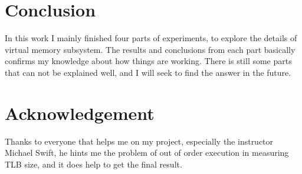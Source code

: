 \section{Conclusion}
    \label{sec:conc}
   In this work I mainly finished four parts of experiments, to explore the details of virtual memory subsystem. The results and conclusions from each part basically confirms my knowledge about how things are working. There is still some parts that can not be explained well, and I will seek to find the answer in the future.


\section{Acknowledgement}
    \label{sec:ack}
   Thanks to everyone that helps me on my project, especially the instructor Michael Swift, he hints me the problem of out of order execution in measuring TLB size, and it does help to get the final result.


